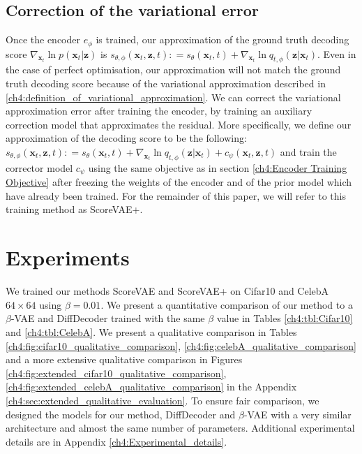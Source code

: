 \subsection{Correction of the variational error}
Once the encoder $e_{\phi}$ is trained, our approximation of the ground truth decoding score $\nabla_{\textbf{x}_t}  \ln{p(\textbf{x}_t | \textbf{z})}$ is $s_{\theta, \phi}(\textbf{x}_t, \textbf{z}, t) : = s_\theta(\textbf{x}_t, t) + \nabla_{\textbf{x}_t} \ln q_{t, \phi}(\textbf{z} | \textbf{x}_t)$. Even in the case of perfect optimisation, our approximation will not match the ground truth decoding score because of the variational approximation described in \ref{ch4:definition_of_variational_approximation}. We can correct the variational approximation error after training the encoder, by training an auxiliary correction model that approximates the residual. More specifically, we define our approximation of the decoding score to be the following: 
$s_{\theta, \phi}(\textbf{x}_t, \textbf{z}, t) : = s_\theta(\textbf{x}_t, t) + \nabla_{\textbf{x}_t} \ln q_{t, \phi}(\textbf{z} | \textbf{x}_t)+c_{\psi}(\textbf{x}_t, \textbf{z}, t)$ and train the corrector model $c_{\psi}$ using the same objective as in section \ref{ch4:Encoder Training Objective} after freezing the weights of the encoder and of the prior model which have already been trained. For the remainder of this paper, we will refer to this training method as ScoreVAE+.

\section{Experiments} \label{ch4:Experiments}
We trained our methods ScoreVAE and ScoreVAE+ on Cifar10 and CelebA $64\times 64$ using $\beta = 0.01$. We present a quantitative comparison of our method to a $\beta$-VAE and DiffDecoder trained with the same $\beta$ value in Tables \ref{ch4:tbl:Cifar10} and \ref{ch4:tbl:CelebA}. We present a qualitative comparison in Tables \ref{ch4:fig:cifar10_qualitative_comparison}, \ref{ch4:fig:celebA_qualitative_comparison} and a more extensive qualitative comparison in Figures \ref{ch4:fig:extended_cifar10_qualitative_comparison}, \ref{ch4:fig:extended_celebA_qualitative_comparison} in the Appendix \ref{ch4:sec:extended_qualitative_evaluation}. To ensure fair comparison, we designed the models for our method, DiffDecoder and $\beta$-VAE with a very similar architecture and almost the same number of parameters. Additional experimental details are in Appendix \ref{ch4:Experimental_details}. 

